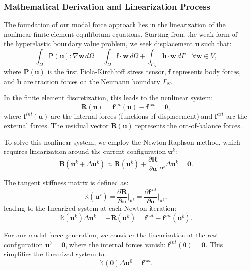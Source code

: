 \subsubsection{Mathematical Derivation and Linearization Process}

The foundation of our modal force approach lies in the linearization of the nonlinear finite element equilibrium equations. Starting from the weak form of the hyperelastic boundary value problem, we seek displacement $\bm{u}$ such that:
\begin{equation}
    \int_{\Omega} \bm{P}(\bm{u}) : \nabla \bm{w} \, d\Omega = \int_{\Omega} \bm{f} \cdot \bm{w} \, d\Omega + \int_{\Gamma_N} \bm{h} \cdot \bm{w} \, d\Gamma \quad \forall \bm{w} \in V,
\end{equation}
where $\bm{P}(\bm{u})$ is the first Piola-Kirchhoff stress tensor, $\bm{f}$ represents body forces, and $\bm{h}$ are traction forces on the Neumann boundary $\Gamma_N$.

In the finite element discretization, this leads to the nonlinear system:
\begin{equation}
    \bm{R}(\bm{u}) = \bm{f}^{int}(\bm{u}) - \bm{f}^{ext} = \bm{0},
\end{equation}
where $\bm{f}^{int}(\bm{u})$ are the internal forces (functions of displacement) and $\bm{f}^{ext}$ are the external forces. The residual vector $\bm{R}(\bm{u})$ represents the out-of-balance forces.

To solve this nonlinear system, we employ the Newton-Raphson method, which requires linearization around the current configuration $\bm{u}^k$:
\begin{equation}
    \bm{R}(\bm{u}^k + \Delta\bm{u}^k) \approx \bm{R}(\bm{u}^k) + \frac{\partial \bm{R}}{\partial \bm{u}}\bigg|_{\bm{u}^k} \Delta\bm{u}^k = \bm{0}.
\end{equation}

The tangent stiffness matrix is defined as:
\begin{equation}
    \mathbb{K}(\bm{u}^k) = \frac{\partial \bm{R}}{\partial \bm{u}}\bigg|_{\bm{u}^k} = \frac{\partial \bm{f}^{int}}{\partial \bm{u}}\bigg|_{\bm{u}^k},
\end{equation}
leading to the linearized system at each Newton iteration:
\begin{equation}
    \mathbb{K}(\bm{u}^k) \Delta\bm{u}^k = -\bm{R}(\bm{u}^k) = \bm{f}^{ext} - \bm{f}^{int}(\bm{u}^k).
\end{equation}

For our modal force generation, we consider the linearization at the rest configuration $\bm{u}^0 = \bm{0}$, where the internal forces vanish: $\bm{f}^{int}(\bm{0}) = \bm{0}$. This simplifies the linearized system to:
\begin{equation}
    \mathbb{K}(\bm{0}) \Delta\bm{u}^0 = \bm{f}^{ext}.
\end{equation}

